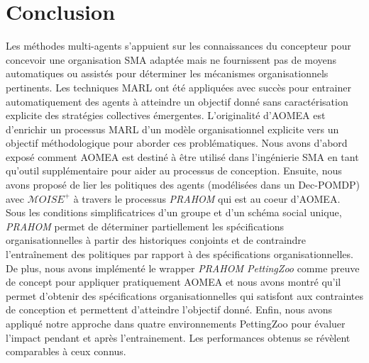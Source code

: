 \documentclass[demonstration]{jfsma}
\begin{document}



\section{Conclusion}

Les méthodes multi-agents s'appuient sur les connaissances du concepteur pour concevoir une organisation SMA adaptée mais ne fournissent pas de moyens automatiques ou assistés pour déterminer les mécanismes organisationnels pertinents.
Les techniques MARL ont été appliquées avec succès pour entrainer automatiquement des agents à atteindre un objectif donné sans caractérisation explicite des stratégies collectives émergentes.
L'originalité d'AOMEA est d'enrichir un processus MARL d'un modèle organisationnel explicite vers un objectif méthodologique pour aborder ces problématiques. Nous avons d'abord exposé comment AOMEA est destiné à être utilisé dans l'ingénierie SMA en tant qu'outil supplémentaire pour aider au processus de conception.
Ensuite, nous avons proposé de lier les politiques des agents (modélisées dans un Dec-POMDP) avec $\mathcal{M}OISE^+$ à travers le processus \emph{PRAHOM} qui est au coeur d'AOMEA. Sous les conditions simplificatrices d'un groupe et d'un schéma social unique, \emph{PRAHOM} permet de déterminer partiellement les spécifications organisationnelles à partir des historiques conjoints et de contraindre l'entraînement des politiques par rapport à des spécifications organisationnelles.
De plus, nous avons implémenté le wrapper \emph{PRAHOM PettingZoo} comme preuve de concept pour appliquer pratiquement AOMEA et nous avons montré qu'il permet d'obtenir des spécifications organisationnelles qui satisfont aux contraintes de conception et permettent d'atteindre l'objectif donné.
Enfin, nous avons appliqué notre approche dans quatre environnements PettingZoo pour évaluer l'impact pendant et après l'entrainement. Les performances obtenus se révèlent comparables à ceux connus.
\end{document}
